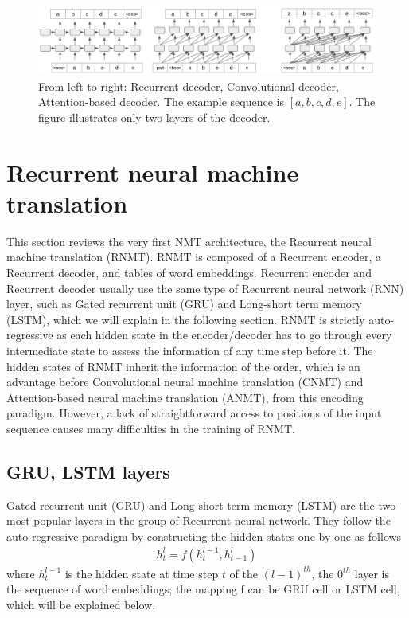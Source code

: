 \begin{figure}[htbp]
\includegraphics[width=\textwidth]{graphics/multi_layer_decoder.png}
\caption[Illustration of 3 most popular multi-layer auto-regressive decoding paradigms]{From left to right: Recurrent decoder, Convolutional decoder, Attention-based decoder. The example sequence is $[a,b,c,d,e]$. The figure illustrates only two layers of the decoder.}
\label{fig:multi-layer}
\end{figure}

\section{Recurrent neural machine translation} \label{sec:rrn}
This section reviews the very first NMT architecture, the Recurrent neural machine translation (RNMT). RNMT is composed of a Recurrent encoder, a Recurrent decoder, and tables of word embeddings. Recurrent encoder and Recurrent decoder usually use the same type of Recurrent neural network (RNN) layer, such as Gated recurrent unit (GRU) and Long-short term memory (LSTM), which we will explain in the following section. RNMT is strictly auto-regressive as each hidden state in the encoder/decoder has to go through every intermediate state to assess the information of any time step before it. The hidden states of RNMT inherit the information of the order, which is an advantage before Convolutional neural machine translation (CNMT) and Attention-based neural machine translation (ANMT), from this encoding paradigm. However, a lack of straightforward access to positions of the input sequence causes many difficulties in the training of RNMT.

\subsection{GRU, LSTM layers}
Gated recurrent unit (GRU) and Long-short term memory (LSTM) are the two most popular layers in the group of Recurrent neural network. They follow the auto-regressive paradigm by constructing the hidden states one by one as follows
\begin{equation}
\begin{array}{rcl}
h^l_t = f(h^{l-1}_t, h^l_{t-1})
\end{array}
\end{equation}
where $h^{l-1}_t$ is the hidden state at time step $t$ of the $(l-1)^{th}$, the $0^{th}$ layer is the sequence of word embeddings; the mapping f can be GRU cell or LSTM cell, which will be explained below.

